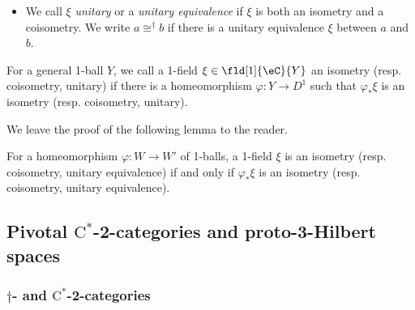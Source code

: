 \documentclass[12pt,reqno]{amsart}
\newcommand{\C}{\eC}
\newcommand{\Cstar}{\ensuremath{\mathrm{C}^{*}}}
\newcommand{\defn}[1]{\emph{#1}}
\renewcommand{\star}{\dag}
\begin{document}
\begin{definition}
\begin{itemize}
\[\begin{tkz}[scale=0.7]
    \draw[red,thick] (0,0) circle (0.5);
    \draw[<-,red] (155:0.2) -- (155:1.75) node[above left=-1.75mm] {\scriptsize$a \times D^2$};
    \draw[<-,violet] (205:1.0) -- (205:1.75) node[below left=-1.75mm] {\scriptsize$\xi^\star \times S^1$};
\end{tkz}
\quad
=
\quad
\begin{tkz}[scale=0.7]
    \fill[blue!20] (0,0) circle (1.5);
    \begin{scope}
        \clip (0,0) circle (1.5);
        \draw[blue!60!black, step=0.15, very thin] (-1.5,-1.5) grid (1.5,1.5);
    \end{scope}
    \draw[blue,thick] (0,0) circle (1.5);
    \draw[<-,blue] (10:0.75) -- (10:1.75) node[right,yshift=.5ex] {\scriptsize$b \times D^2$};
\end{tkz}
\]
\item We call $\xi$ \defn{unitary} or a \defn{unitary equivalence} if $\xi$ is both an isometry and a coisometry. We write $a\cong^\star b$ if there is a unitary equivalence $\xi$ between $a$ and $b$.
\end{itemize}
For a general 1-ball $Y$, we call a 1-field $\xi\in\fld[1]{\C}{Y}$ an isometry (resp. coisometry, unitary) if there is a homeomorphism $\varphi\colon Y\to D^1$ such that $\varphi_*\xi$ is an isometry (resp. coisometry, unitary).
\end{definition}

We leave the proof of the following lemma to the reader.
\begin{lemma}\label{equivunitaryequiv}
For a homeomorphism $\varphi\colon W\to W'$ of 1-balls, a 1-field $\xi$ is an isometry (resp. coisometry, unitary equivalence) if and only if $\varphi_*\xi$ is an isometry (resp. coisometry, unitary equivalence). 
\end{lemma}

\subsection{Pivotal \texorpdfstring{$\Cstar$}{C*}-2-categories and proto-3-Hilbert spaces}

\subsubsection{\texorpdfstring{$\dag$}{Dagger}- and \texorpdfstring{$\Cstar$}{C*}-2-categories}

\
\end{document}

